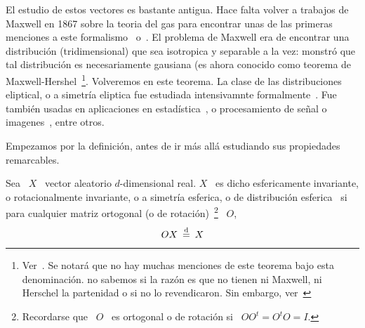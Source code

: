 \label{Ssec:MP:FamiliaEliptica}


El estudio de  estos vectores es bastante antigua. Hace  falta volver a trabajos
de Maxwell en 1867  sobre la teoria del gas para encontrar  unas de las primeras
menciones  a este  formalismo~\cite{Max67}  o~\cite[pp.~377--391]{Nie52:v1}.  El
problema de Maxwell era de encontrar una distribuci\'on (tridimensional) que sea
isotropica  y  separable   a  la  vez:  monstr\'o  que   tal  distribuci\'on  es
necesariamente    gausiana    (es     ahora    conocido    como    teorema    de
Maxwell-Hershel~\footnote{Ver~\cite[Prop.~4.11]{BilBre99}.   Se notar\'a  que no
  hay muchas menciones  de este teorema bajo esta  denominaci\'on. no sabemos si
  la raz\'on es que  no tienen ni Maxwell, ni Herschel la  partenidad o si no lo
  revendicaron. Sin embargo, ver~\cite{Max67}}.   Volveremos en este teorema. La
clase de  las distribuciones  eliptical, o a  simetr\'ia eliptica  fue estudiada
intensivamnte formalmente~\cite{Bar34, Bar34:07,  Ver64, CamHua81, Eat81, Kan94,
  Lau75, Yao73,  KotNad01, FanKot90, Mui82,  BilBre99}. Fue tambi\'en  usadas en
aplicaciones   en  estad\'istica~\cite{BlaTho68,   Chu73,   YanKot03,  ArePin06,
  ChiPas08},  o  procesamiento  de  se\~nal  o  imagenes~\cite{Gol76,  RanWei93,
  RanWei95, ZozVig10, Zoz12}, entre otros.

Empezamos  por  la  definici\'on,  antes  de  ir  m\'as  all\'a  estudiando  sus
propiedades remarcables.

\begin{definicion}
  Sea  \  $X$  \  vector   aleatorio  $d$-dimensional  real.   $X$  \  es  dicho
  esfericamente  invariante,  o   rotacionalmente  invariante,  o  a  simetr\'ia
  esferica, o de distribuci\'on esferica \ si para cualquier matriz ortogonal (o
  de rotaci\'on)~\footnote{Recordarse que \ $O$  \ es ortogonal o de rotaci\'on
    si \ $O O^t = O^t O = I$.} \ $O$,
  \[
  O  X  \: \stackrel{\mathrm{d}}{=}  \: X
  \]
\end{definicion}

